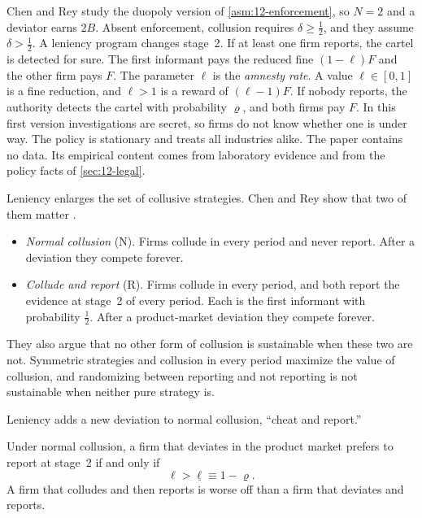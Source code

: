 Chen and Rey study the duopoly version of \cref{asm:12-enforcement}, so $N = 2$ and a deviator earns $2B$. Absent
enforcement, collusion requires $\delta \ge \frac{1}{2}$, and they assume $\delta > \frac{1}{2}$. A leniency program
changes stage~2. If at least one firm reports, the cartel is detected for sure. The first informant pays the reduced
fine $(1-\ell)F$ and the other firm pays $F$. The parameter $\ell$ is the \emph{amnesty rate}. A value
$\ell \in [0,1]$ is a fine reduction, and $\ell > 1$ is a reward of $(\ell - 1)F$. If nobody reports, the authority
detects the cartel with probability $\varrho$, and both firms pay $F$. In this first version investigations are
secret, so firms do not know whether one is under way. The policy is stationary and treats all industries alike. The
paper contains no data. Its empirical content comes from laboratory evidence and from the policy facts of
\cref{sec:12-legal}.

Leniency enlarges the set of collusive strategies. Chen and Rey show that two of them matter
\citep[p.~10 and footnote~12]{ChenRey2013}.
\begin{itemize}
\item \emph{Normal collusion} (N). Firms collude in every period and never report. After a deviation they compete
forever.
\item \emph{Collude and report} (R). Firms collude in every period, and both report the evidence at stage~2 of every
period. Each is the first informant with probability $\frac{1}{2}$. After a product-market deviation they compete
forever.
\end{itemize}
They also argue that no other form of collusion is sustainable when these two are not. Symmetric strategies and
collusion in every period maximize the value of collusion, and randomizing between reporting and not reporting is
not sustainable when neither pure strategy is.

Leniency adds a new deviation to normal collusion, ``cheat and report.''

\begin{lemma}\label{lem:12-cr-report}
Under normal collusion, a firm that deviates in the product market prefers to report at stage~2 if and only if
\begin{equation}\label{eq:12-cr-qlow}
\ell > \underline\ell \equiv 1 - \varrho.
\end{equation}
A firm that colludes and then reports is worse off than a firm that deviates and reports.
\end{lemma}

